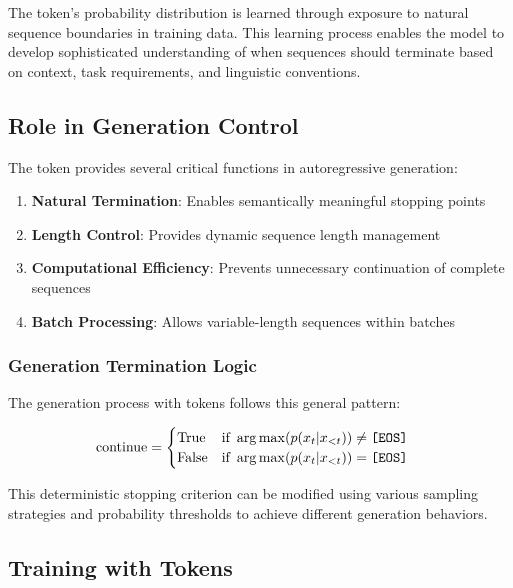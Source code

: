 The \eos{} token's probability distribution is learned through exposure to natural sequence boundaries in training data. This learning process enables the model to develop sophisticated understanding of when sequences should terminate based on context, task requirements, and linguistic conventions.

\subsection{Role in Generation Control}

The \eos{} token provides several critical functions in autoregressive generation:

\begin{enumerate}
\item \textbf{Natural Termination}: Enables semantically meaningful stopping points
\item \textbf{Length Control}: Provides dynamic sequence length management
\item \textbf{Computational Efficiency}: Prevents unnecessary continuation of complete sequences
\item \textbf{Batch Processing}: Allows variable-length sequences within batches
\end{enumerate}

\subsubsection{Generation Termination Logic}

The generation process with \eos{} tokens follows this general pattern:

\begin{align}
\text{continue} &= \begin{cases} 
\text{True} & \text{if } \arg\max(p(x_t | x_{<t})) \neq \text{\texttt{[EOS]}{}} \\
\text{False} & \text{if } \arg\max(p(x_t | x_{<t})) = \text{\texttt{[EOS]}{}}
\end{cases}
\end{align}

This deterministic stopping criterion can be modified using various sampling strategies and probability thresholds to achieve different generation behaviors.

\subsection{Training with \eos{} Tokens}

